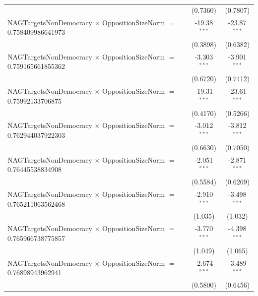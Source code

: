 \begin{tabular}{lcc}
                                                                                & (0.7360)             & (0.7807)\\   
   NAGTargetsNonDemocracy $\times$ OppositionSizeNorm $=$ 0.758409986641973     & -19.38$^{***}$       & -23.87$^{***}$\\   
                                                                                & (0.3898)             & (0.6382)\\   
   NAGTargetsNonDemocracy $\times$ OppositionSizeNorm $=$ 0.759165661855362     & -3.303$^{***}$       & -3.901$^{***}$\\   
                                                                                & (0.6720)             & (0.7412)\\   
   NAGTargetsNonDemocracy $\times$ OppositionSizeNorm $=$ 0.75992133706875      & -19.31$^{***}$       & -23.61$^{***}$\\   
                                                                                & (0.4170)             & (0.5266)\\   
   NAGTargetsNonDemocracy $\times$ OppositionSizeNorm $=$ 0.762944037922303     & -3.012$^{***}$       & -3.812$^{***}$\\   
                                                                                & (0.6630)             & (0.7050)\\   
   NAGTargetsNonDemocracy $\times$ OppositionSizeNorm $=$ 0.76445538834908      & -2.051$^{***}$       & -2.871$^{***}$\\   
                                                                                & (0.5584)             & (0.6269)\\   
   NAGTargetsNonDemocracy $\times$ OppositionSizeNorm $=$ 0.765211063562468     & -2.910$^{***}$       & -3.498$^{***}$\\   
                                                                                & (1.035)              & (1.032)\\   
   NAGTargetsNonDemocracy $\times$ OppositionSizeNorm $=$ 0.765966738775857     & -3.770$^{***}$       & -4.398$^{***}$\\   
                                                                                & (1.049)              & (1.065)\\   
   NAGTargetsNonDemocracy $\times$ OppositionSizeNorm $=$ 0.76898943962941      & -2.674$^{***}$       & -3.489$^{***}$\\   
                                                                                & (0.5800)             & (0.6456)\\   

\end{tabular}
